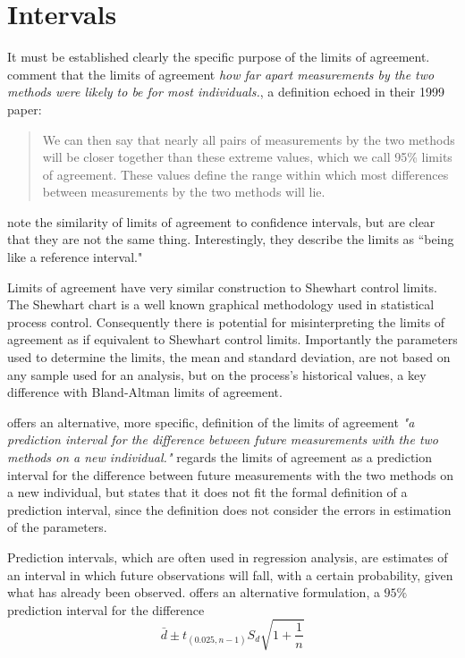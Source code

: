 \documentclass[Main.tex]{subfiles}
\begin{document}
	
	

\section{Intervals}
It must be established
clearly the specific purpose of the limits of agreement.
\citet*{BA95} comment that the limits of agreement \emph{how far
	apart measurements by the two methods were likely to be for most
	individuals.}, a definition echoed in their 1999 paper:
\begin{quote} We can then say that nearly all pairs
	of measurements by the two methods will be closer together than
	these extreme values, which we call 95\% limits of agreement.
	These values define the range within which most differences
	between measurements by the two methods will lie\citep{BA99}.
\end{quote}


	\citet{BA99} note the similarity of limits of agreement to
	confidence intervals, but are clear that they are not the same
	thing. Interestingly, they describe the limits as ``being like a
	reference interval."
	
	Limits of agreement have very similar construction to Shewhart
	control limits. The Shewhart chart is a well known graphical
	methodology used in statistical process control. Consequently
	there is potential for misinterpreting the limits of agreement as
	if equivalent to Shewhart control limits. Importantly the
	parameters used to determine the limits, the mean and standard
	deviation, are not based on any sample used for an analysis, but
	on the process's historical values, a key difference with
	Bland-Altman limits of agreement.
	
	\citet{BXC2008} offers an alternative, more specific,  definition of
	the limits of agreement \emph{"a prediction interval for the
		difference between future measurements with the two methods on a
		new individual."} \citet{BXC2008} regards the limits of agreement as a prediction
	interval for the difference between future measurements with the
	two methods on a new individual, but states that it does not fit
	the formal definition of a prediction interval, since the
	definition does not consider the errors in estimation of the
	parameters. 

	
	Prediction intervals, which are often used in
	regression analysis, are estimates of an interval in which future
	observations will fall, with a certain probability, given what has
	already been observed. \citet{BXC2008} offers an alternative
	formulation, a $95\%$ prediction interval for the difference
	\begin{equation}
	\bar{d} \pm t_{(0.025, n-1)}S_{d} \sqrt{1+\frac{1}{n}}
	\end{equation}
	
\end{document}
